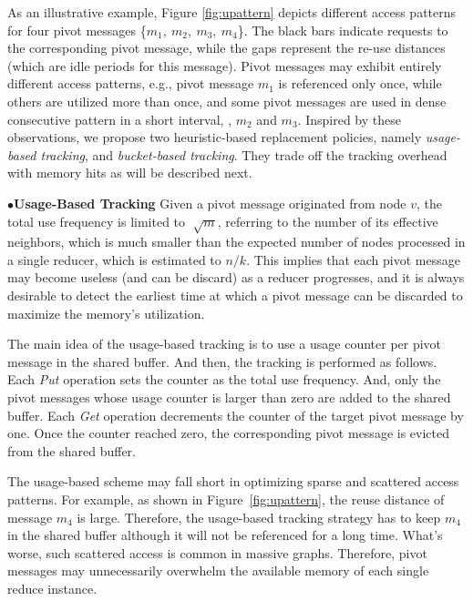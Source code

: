 As an illustrative example, Figure \ref{fig:upattern} depicts different access patterns for four pivot messages \{$m_1,~m_2,~m_3,~m_4$\}. 
The black bars indicate requests to the corresponding pivot message, while the gaps represent the re-use distances (which are idle periods for this message). 
Pivot messages may exhibit entirely different access patterns, e.g., pivot message $m_1$ is referenced only once, while others are utilized more than once, and some pivot messages are used in dense consecutive pattern in a short interval, {\eg}, $m_2$ and $m_3$. 
%
Inspired by these observations, we propose two heuristic-based replacement policies, namely \emph{usage-based tracking}, and \emph{bucket-based tracking}. 
They trade off the tracking overhead with memory hits as will be described next. 


\hspace{-2em}
\textbf{$\bullet$Usage-Based Tracking}
Given a pivot message originated from node $v$, the total use frequency is limited to $\sqrt[]{m}$, referring to the number of its effective neighbors, which is much smaller than the expected number of nodes processed in a single reducer, which is estimated to $n/k$. This  implies that each pivot message may become useless (and can be discard) as a reducer progresses, and it is always desirable to detect the earliest time at which a pivot message can be discarded to maximize the  memory's utilization.

The main idea of the usage-based tracking is to use a usage counter per pivot message in the shared buffer. And then, the tracking is performed as follows. Each \emph{Put} operation sets the counter as the total use frequency. And, only the pivot messages whose usage counter is larger than zero are added to the shared buffer. Each \emph{Get} operation decrements the counter of the target pivot message by one. Once the counter reached zero, the corresponding pivot message is evicted from the shared buffer. 

The usage-based scheme may fall short in optimizing sparse and scattered access patterns. For example, as shown in Figure~\ref{fig:upattern}, the reuse distance of message $m_4$ is large. Therefore, the usage-based tracking strategy has to keep $m_4$ in the shared buffer although it will not be referenced for a long time. What's worse, such  scattered access is common in massive graphs. Therefore,  pivot messages may unnecessarily overwhelm the available memory of each single reduce instance.  

